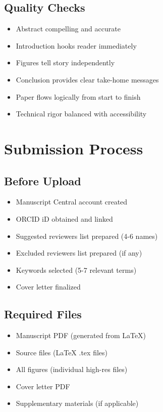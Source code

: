 \documentclass[11pt]{article}
\begin{document}
\subsection{Quality Checks}

\begin{itemize}[label=$\square$]
    \item Abstract compelling and accurate
    \item Introduction hooks reader immediately
    \item Figures tell story independently
    \item Conclusion provides clear take-home messages
    \item Paper flows logically from start to finish
    \item Technical rigor balanced with accessibility
\end{itemize}

\section{Submission Process}

\subsection{Before Upload}

\begin{itemize}[label=$\square$]
    \item Manuscript Central account created
    \item ORCID iD obtained and linked
    \item Suggested reviewers list prepared (4-6 names)
    \item Excluded reviewers list prepared (if any)
    \item Keywords selected (5-7 relevant terms)
    \item Cover letter finalized
\end{itemize}

\subsection{Required Files}

\begin{itemize}[label=$\square$]
    \item Manuscript PDF (generated from LaTeX)
    \item Source files (LaTeX .tex files)
    \item All figures (individual high-res files)
    \item Cover letter PDF
    \item Supplementary materials (if applicable)
\end{itemize}
\end{document}

